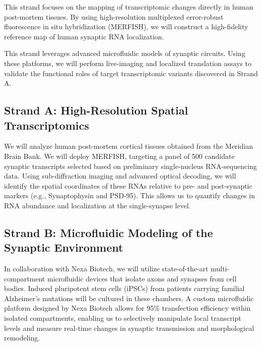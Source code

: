 \documentclass[10pt,a4paper]{article}
\begin{document}
\noindent
\begin{minipage}[t]{0.48\textwidth}
    \begin{tcolorbox}[
        enhanced,
        title=\sffamily\bfseries Strand A: Spatial Profiling,
        colback=bgcolor,
        colframe=primarycolor,
        coltitle=white,
        arc=4pt,
        boxrule=1.5pt,
        height=4.0cm
    ]
        \small
        This strand focuses on the mapping of transcriptomic changes directly in human post-mortem tissues. By using high-resolution multiplexed error-robust fluorescence in situ hybridization (MERFISH), we will construct a high-fidelity reference map of human synaptic RNA localization.
    \end{tcolorbox}
\end{minipage}%
\hfill
\begin{minipage}[t]{0.48\textwidth}
    \begin{tcolorbox}[
        enhanced,
        title=\sffamily\bfseries Strand B: Functional Validation,
        colback=bgcolor,
        colframe=secondarycolor,
        coltitle=white,
        arc=4pt,
        boxrule=1.5pt,
        height=4.0cm
    ]
        \small
        This strand leverages advanced microfluidic models of synaptic circuits. Using these platforms, we will perform live-imaging and localized translation assays to validate the functional roles of target transcriptomic variants discovered in Strand A.
    \end{tcolorbox}
\end{minipage}

\subsection{Strand A: High-Resolution Spatial Transcriptomics}
We will analyze human post-mortem cortical tissues obtained from the Meridian Brain Bank. We will deploy MERFISH, targeting a panel of 500 candidate synaptic transcripts selected based on preliminary single-nucleus RNA-sequencing data. Using sub-diffraction imaging and advanced optical decoding, we will identify the spatial coordinates of these RNAs relative to pre- and post-synaptic markers (e.g., Synaptophysin and PSD-95). This allows us to quantify changes in RNA abundance and localization at the single-synapse level.

\subsection{Strand B: Microfluidic Modeling of the Synaptic Environment}
In collaboration with Nexa Biotech, we will utilize state-of-the-art multi-compartment microfluidic devices that isolate axons and synapses from cell bodies. Induced pluripotent stem cells (iPSCs) from patients carrying familial Alzheimer's mutations will be cultured in these chambers. A custom microfluidic platform designed by Nexa Biotech allows for 95\% transfection efficiency within isolated compartments, enabling us to selectively manipulate local transcript levels and measure real-time changes in synaptic transmission and morphological remodeling.
\end{document}
